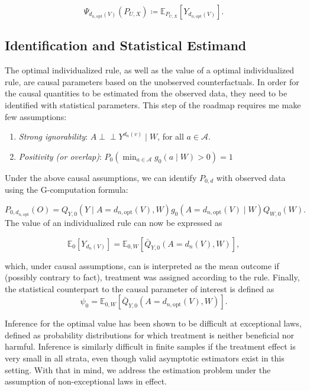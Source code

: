 \documentclass[12pt, krantz2,]{krantz}
\providecommand{\tightlist}{%
  \setlength{\itemsep}{0pt}\setlength{\parskip}{0pt}}
\theoremstyle{definition}
\theoremstyle{definition}
\theoremstyle{definition}
\newcommand{\E}{\mathbb{E}}
\newcommand{\1}{\mathbbm{1}}
\newcommand{\indep}{\mbox{$\perp\!\!\!\perp$}}
\begin{document}
\[\Psi_{d_{n, \text{opt}}(V)}(P_{U,X}) \coloneqq \E_{P_{U,X}}[Y_{d_{n,
\text{opt}}(V)}].\]

\hypertarget{identification-and-statistical-estimand}{%
\subsection{Identification and Statistical Estimand}\label{identification-and-statistical-estimand}}

The optimal individualized rule, as well as the value of a optimal
individualized rule, are causal parameters based on the unobserved
counterfactuals. In order for the causal quantities to be estimated from the
observed data, they need to be identified with statistical parameters. This step
of the roadmap requires me make few assumptions:

\begin{enumerate}
\def\labelenumi{\arabic{enumi}.}
\tightlist
\item
  \emph{Strong ignorability}: \(A \indep Y^{d_n(v)} \mid W\), for all \(a \in \mathcal{A}\).
\item
  \emph{Positivity (or overlap)}: \(P_0(\min_{a \in \mathcal{A}} g_0(a \mid W) > 0) = 1\)
\end{enumerate}

Under the above causal assumptions, we can identify \(P_{0,d}\) with observed data
using the G-computation formula:

\[P_{0,d_{n, \text{opt}}}(O) = Q_{Y,0}(Y \mid A=d_{n,\text{opt}}(V),W)
g_0(A=d_{n,\text{opt}}(V) \mid W)Q_{W,0}(W).\]
The value of an individualized rule can now be expressed as

\[\E_0[Y_{d_n(V)}] = \E_{0,W}[\bar{Q}_{Y,0}(A=d_n(V),W)],\]

which, under causal assumptions, can is interpreted as the mean outcome if
(possibly contrary to fact), treatment was assigned according to the rule.
Finally, the statistical counterpart to the causal parameter of interest is
defined as
\[\psi_0 = \E_{0,W}[\bar{Q}_{Y,0}(A=d_{n,\text{opt}}(V),W)].\]

Inference for the optimal value has been shown to be difficult at exceptional
laws, defined as probability distributions for which treatment is neither
beneficial nor harmful. Inference is similarly difficult in finite samples if
the treatment effect is very small in all strata, even though valid asymptotic
estimators exist in this setting. With that in mind, we address the estimation
problem under the assumption of non-exceptional laws in effect.
\end{document}
